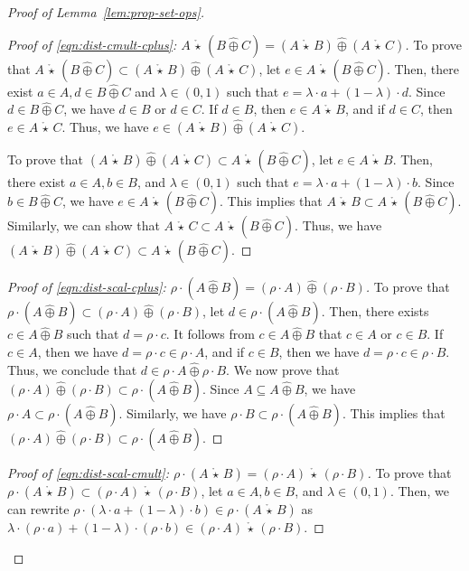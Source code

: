 \documentclass[10pt]{amsart}
\theoremstyle{plain}
\theoremstyle{definition}
\providecommand{\cplus}[0]{\ensuremath{\hat{\oplus}}\xspace}
\providecommand{\cmult}[0]{\ensuremath{{\,\mathring{\star}\,}}\xspace}
\begin{document}
\begin{proof}[Proof of Lemma~\ref{lem:prop-set-ops}]
\begin{proof}[Proof of \eqref{eqn:dist-cmult-cplus}: $A\cmult (B\cplus C)=(A\cmult B)\cplus (A\cmult C)$] 
To prove that $A\cmult (B\cplus C)\subset (A\cmult B)\cplus (A\cmult C)$, let $e\in A\cmult (B\cplus C)$. Then, there exist $a\in A, d\in B\cplus C$ and $\lambda\in (0,1)$ such that $e=\lambda \cdot a+(1-\lambda)\cdot d$. Since $d\in B\cplus C$, we have $d\in B$ or $d\in C$. If $d\in B$, then $e\in A\cmult B$, and if $d\in C$, then $e\in A\cmult C$. Thus, we have $e\in (A\cmult B)\cplus (A\cmult C)$.

To prove that $(A\cmult B)\cplus (A\cmult C)\subset A\cmult (B\cplus C)$,  let $e\in A\cmult B$. Then, there exist $a\in A, b\in B$, and $\lambda\in (0,1)$ such that $e=\lambda\cdot a+(1-\lambda)\cdot b$. Since $b\in B\cplus C$, we have $e\in A\cmult (B\cplus C)$. This implies that $A\cmult B\subset A\cmult (B\cplus C)$. Similarly, we can show that $A\cmult C\subset A\cmult (B\cplus C)$. Thus, we have $(A\cmult B)\cplus (A\cmult C)\subset A\cmult (B\cplus C)$.  
\end{proof}


\begin{proof}[Proof of \eqref{eqn:dist-scal-cplus}: $\rho\cdot (A\cplus B)=(\rho\cdot A)\cplus (\rho\cdot B)$] 
To prove that $\rho\cdot (A\cplus B) \subset(\rho\cdot A)\cplus (\rho\cdot B)$,
let $d\in \rho\cdot (A\cplus B)$. Then, there exists $c\in A\cplus B$ such that $d=\rho\cdot c$. It follows from $c\in A\cplus B$ that $c\in A$ or $c\in B$.
If $c\in A$, then we have $d=\rho\cdot c\in \rho\cdot A$, and if $c\in B$, then we have $d=\rho\cdot c\in \rho\cdot B$. Thus, we conclude that $d\in \rho\cdot A\cplus \rho\cdot B$.
We now prove that $(\rho\cdot A)\cplus (\rho\cdot B)\subset \rho\cdot (A\cplus B)$.
    Since $A\subseteq A\cplus B$, we have $\rho\cdot A\subset \rho\cdot (A\cplus B)$. Similarly, we have $\rho\cdot B\subset \rho \cdot (A\cplus B)$. This implies that $(\rho\cdot A)\cplus (\rho\cdot B)\subset \rho\cdot (A\cplus B)$.
\end{proof}


\begin{proof}[Proof of \eqref{eqn:dist-scal-cmult}: $\rho\cdot (A\cmult B) = (\rho\cdot A) \cmult(\rho\cdot B)$] 
To prove that $\rho\cdot (A\cmult B) \subset (\rho\cdot A) \cmult (\rho\cdot B)$,
let $a\in A, b\in B$, and $\lambda\in (0,1)$. Then, 
we can rewrite 
$\rho\cdot (\lambda\cdot a+(1-\lambda)\cdot b)\in \rho\cdot (A \cmult B)$ as $\lambda\cdot (\rho\cdot a)+(1-\lambda)\cdot (\rho\cdot b)\in (\rho\cdot A) \cmult (\rho\cdot B)$. 


\end{proof}
\end{proof}
\end{document}
